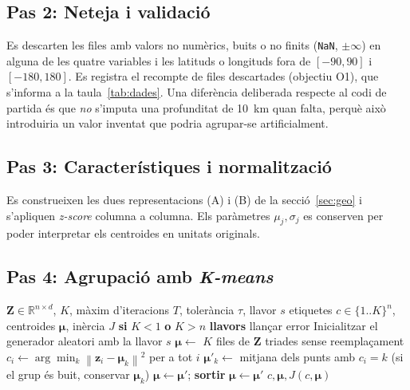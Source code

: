 \documentclass[11pt,a4paper]{article}
\newcommand{\R}{\mathbb{R}}
\newcommand{\norm}[1]{\left\lVert #1 \right\rVert}
\begin{document}
\subsection{Pas 2: Neteja i validació}
Es descarten les files amb valors no numèrics, buits o no finits (\texttt{NaN},
$\pm\infty$) en alguna de les quatre variables i les latituds o longituds fora
de $[-90,90]$ i $[-180,180]$. Es registra el recompte de files descartades
(objectiu O1), que s'informa a la taula~\ref{tab:dades}. Una diferència
deliberada respecte al codi de partida és que \emph{no} s'imputa una
profunditat de 10~km quan falta, perquè això introduiria un valor inventat que
podria agrupar-se artificialment.

\subsection{Pas 3: Característiques i normalització}
Es construeixen les dues representacions (A) i (B) de la
secció~\ref{sec:geo} i s'apliquen \textit{z-score} columna a columna. Els
paràmetres $\mu_j,\sigma_j$ es conserven per poder interpretar els centroides
en unitats originals.

\subsection{Pas 4: Agrupació amb \textit{K-means}}
\begin{algorithm}[htbp]
\caption{\textit{K-means} amb inicialització aleatòria i criteri de parada}
\label{alg:kmeans}
\begin{algorithmic}[1]
\Require $\mathbf{Z}\in\R^{n\times d}$, $K$, màxim d'iteracions $T$, tolerància $\tau$, llavor $s$
\Ensure etiquetes $c\in\{1..K\}^n$, centroides $\boldsymbol\mu$, inèrcia $J$
\State \textbf{si} $K<1$ \textbf{o} $K>n$ \textbf{llavors} llançar error
\State Inicialitzar el generador aleatori amb la llavor $s$
\State $\boldsymbol\mu\gets$ $K$ files de $\mathbf{Z}$ triades sense reemplaçament
  \State $c_i\gets\arg\min_k\norm{\mathbf{z}_i-\boldsymbol\mu_k}^2$ per a tot $i$
  \State $\boldsymbol\mu'_k\gets$ mitjana dels punts amb $c_i=k$ \quad (si el grup és buit, conservar $\boldsymbol\mu_k$)
  \If{$\norm{\boldsymbol\mu'-\boldsymbol\mu}<\tau$} \State $\boldsymbol\mu\gets\boldsymbol\mu'$; \textbf{sortir} \EndIf
  \State $\boldsymbol\mu\gets\boldsymbol\mu'$
\EndFor
\State \Return $c,\boldsymbol\mu,J(c,\boldsymbol\mu)$
\end{algorithmic}
\end{algorithm}
\end{document}
